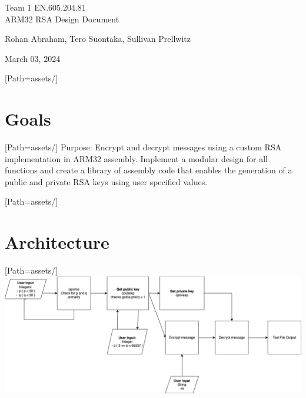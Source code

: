 \documentclass{article}
\begin{document}
\begin{titlepage}

\begin{flushright}

\vspace{7.5cm}

\Huge Team 1 EN.605.204.81 \\ ARM32 RSA Design Document

\vspace{0.5cm}

\Large Rohan Abraham, Tero Suontaka, Sullivan Prellwitz

\vspace{8cm}

\normalsize March 03, 2024

\end{flushright}

\end{titlepage}
\newpage
\tableofcontents
\newpage
\setmainfont{OpenSans-VariableFont_wdth,wght.ttf}[Path=assets/]
\section{Goals}
\setmainfont{OpenSans-VariableFont_wdth,wght.ttf}[Path=assets/]
Purpose: Encrypt and decrypt messages using a custom RSA implementation in ARM32 assembly.
Implement a modular design for all functions and create a library of assembly code that enables the generation of a public and private RSA keys using user specified values.
\newpage

\setmainfont{OpenSans-VariableFont_wdth,wght.ttf}[Path=assets/]
\section{Architecture}
\setmainfont{OpenSans-VariableFont_wdth,wght.ttf}[Path=assets/]
\includegraphics[scale=0.44]{assets/rsa-impl.drawio.png}
\end{document}
